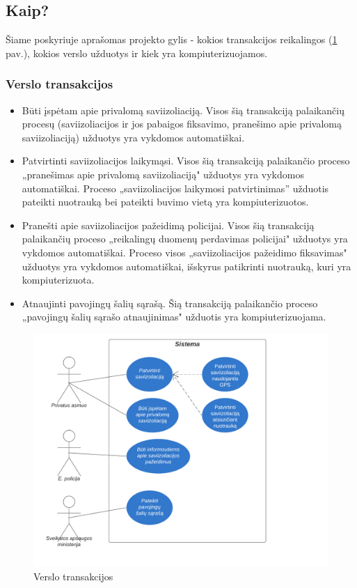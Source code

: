 \documentclass{VUMIFPSkursinis}
\begin{document}
\subsection{Kaip?}
Šiame poskyriuje aprašomas projekto gylis - kokios transakcijos reikalingos (\ref{img:business_transactions} pav.), kokios verslo užduotys ir kiek yra kompiuterizuojamos. 

\subsubsection{Verslo transakcijos}
\begin{itemize}
	\item Būti įspėtam apie privalomą saviizoliaciją. Visos šią transakciją palaikančių procesų (saviizoliacijos ir jos pabaigos fiksavimo, pranešimo apie privalomą saviizoliaciją) užduotys yra vykdomos automatiškai.
	\item Patvirtinti saviizoliacijos laikymąsi. Visos šią transakciją palaikančio proceso „pranešimas apie privalomą saviizoliaciją" užduotys yra vykdomos automatiškai. Proceso „saviizoliacijos laikymosi patvirtinimas'' užduotis pateikti nuotrauką bei pateikti buvimo vietą yra kompiuterizuotos.
	\item Pranešti apie saviizoliacijos pažeidimą policijai. Visos šią transakciją palaikančių proceso „reikalingų duomenų perdavimas policijai" užduotys yra vykdomos automatiškai. Proceso visos „saviizoliacijos pažeidimo fiksavimas" užduotys yra vykdomos automatiškai, išskyrus patikrinti nuotrauką, kuri yra kompiuterizuota.
	\item Atnaujinti pavojingų šalių sąrašą. Šią transakciją palaikančio proceso „pavojingų šalių sąrašo atnaujinimas" užduotis yra kompiuterizuojama.
\end{itemize}

\begin{figure}[H]
	\centering
	\includegraphics[scale=0.7]{img/use_case_diagram_user.png}
	\caption{Verslo transakcijos}
	\label{img:business_transactions}
\end{figure}
\end{document}
